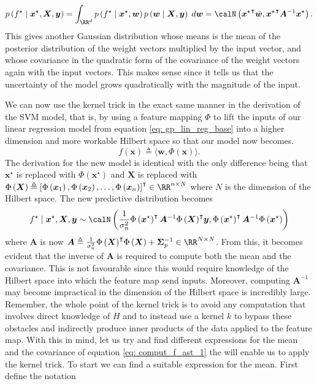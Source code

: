 \begin{equation*}
    p \left( f^{\star} \mid \bm{x}^{\star} , \bm{X} , \bm{y} \right) = \int_{\RR^d} p \left( f^{\star} \mid \bm{x}^{\star} , \bm{w} \right) p \left( \bm{w} \mid \bm{X} , \bm{y} \right) \; d \bm{w} = \calN \left( {\bm{x}^{\star}}^{\intercal} \bar{\bm{w}} , {\bm{x}^{\star}}^{\intercal} \bm{A}^{-1} \bm{x}^{\star} \right).
\end{equation*}
This gives another Gaussian distribution whose means is the mean of the posterior distribution of the weight vectors multiplied by the input vector, and whose covariance in the quadratic form of the covariance of the weight vectors again with the input vectors. This makes sense since it tells us that the uncertainty of the model grows quadratically with the magnitude of the input.

We can now use the kernel trick in the exact same manner in the derivation of the SVM model, that is, by using a feature mapping $\Phi$ to lift the inputs of our linear regression model from equation \ref{eq: gp_lin_reg_base} into a higher dimension and more workable Hilbert space so that our model now becomes.
\begin{equation*} \label{eq: gp_lin_reg_feat_map}
    f \left( \bm{x} \right) \triangleq \langle \bm{w} , \Phi \left( \bm{x} \right) \rangle.
\end{equation*}
The derivation for the new model is identical with the only difference being that $\bm{x}^{\star}$ is replaced with $\Phi \left( \bm{x}^{\star} \right)$ and $\bm{X}$ is replaced with $\Phi \left( \bm{X} \right) \triangleq \left[ \Phi \left( \bm{x}_1 \right), \Phi \left( \bm{x}_2 \right) , \ldots , \Phi \left( \bm{x}_n \right) \right]^{\intercal} \in \RR^{n \times N}$ where $N$ is the dimension of the Hilbert space. The new predictive distribution becomes
\begin{equation} \label{eq: comput_f_ast_1}
    f^{\star} \mid \bm{x}^{\star} , \bm{X} , \bm{y} \sim \calN \left( \frac{1}{\sigma_n^2} \Phi \left( \bm{x}^{\star} \right)^{\intercal} \bm{A}^{-1} {\Phi \left( \bm{X} \right)}^{\intercal} \bm{y} , \Phi \left( \bm{x}^{\star} \right)^{\intercal} \bm{A}^{-1} \Phi \left( \bm{x}^{\star} \right) \right)
\end{equation}
where $\bm{A}$ is now $\bm{A} \triangleq \frac{1}{\sigma_n^2} {\Phi \left( \bm{X} \right)}^{\intercal} \Phi \left( \bm{X} \right) + \bm{\Sigma}_p^{-1} \in \RR^{N \times N}$. From this, it becomes evident that the inverse of $\bm{A}$ is required to compute both the mean and the covariance. This is not favourable since this would require knowledge of the Hilbert space into which the feature map send inputs. Moreover, computing $\bm{A}^{-1}$ may become impractical in the dimension of the Hilbert space is incredibly large. Remember, the whole point of the kernel trick is to avoid any computation that involves direct knowledge of $H$ and to instead use a kernel $k$ to bypass these obstacles and indirectly produce inner products of the data applied to the feature map. With this in mind, let us try and find different expressions for the mean and the covariance of equation \ref{eq: comput_f_ast_1} the will enable us to apply the kernel trick. To start we can find a suitable expression for the mean. First define the notation
